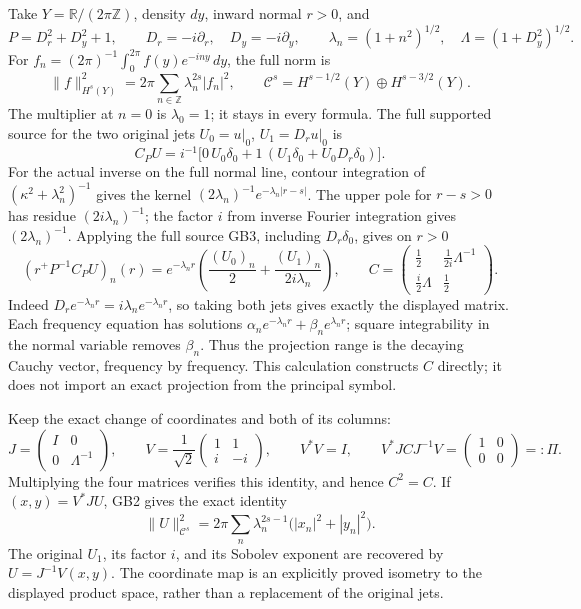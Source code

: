 \documentclass[
  11pt,
]{article}
\begin{document}
Take \(Y=\mathbb R/(2\pi\mathbb Z)\), density \(dy\), inward normal
\(r>0\), and \[
 P=D_r^2+D_y^2+1,\qquad D_r=-i\partial_r,\quad D_y=-i\partial_y,
 \qquad \lambda_n=(1+n^2)^{1/2},\quad \Lambda=(1+D_y^2)^{1/2}.
 \tag{GB1}
\] For \(f_n=(2\pi)^{-1}\int_0^{2\pi}f(y)e^{-iny}\,dy\), the full norm
is \[
 \|f\|_{H^s(Y)}^2=2\pi\sum_{n\in\mathbb Z}\lambda_n^{2s}|f_n|^2,
 \qquad \mathcal C^s=H^{s-1/2}(Y)\oplus H^{s-3/2}(Y).
 \tag{GB2}
\] The multiplier at \(n=0\) is \(\lambda_0=1\); it stays in every
formula. The full supported source for the two original jets
\(U_0=u|_0\), \(U_1=D_ru|_0\) is \[
 C_PU=i^{-1}\bigl[0\,U_0\delta_0+1\,(U_1\delta_0+U_0D_r\delta_0)\bigr].
 \tag{GB3}
\] For the actual inverse on the full normal line, contour integration
of \((\kappa^2+\lambda_n^2)^{-1}\) gives the kernel
\((2\lambda_n)^{-1}e^{-\lambda_n|r-s|}\). The upper pole for \(r-s>0\)
has residue \((2i\lambda_n)^{-1}\); the factor \(i\) from inverse
Fourier integration gives \((2\lambda_n)^{-1}\). Applying the full
source GB3, including \(D_r\delta_0\), gives on \(r>0\) \[
 (r^+P^{-1}C_PU)_n(r)
 =e^{-\lambda_n r}\left(\frac{(U_0)_n}{2}
                           +\frac{(U_1)_n}{2i\lambda_n}\right),
 \qquad
 C=\begin{pmatrix}\frac12&\frac1{2i}\Lambda^{-1}\\
                  \frac i2\Lambda&\frac12\end{pmatrix}.
 \tag{GB4}
\] Indeed \(D_re^{-\lambda_n r}=i\lambda_ne^{-\lambda_n r}\), so taking
both jets gives exactly the displayed matrix. Each frequency equation
has solutions \(\alpha_ne^{-\lambda_nr}+\beta_ne^{\lambda_nr}\); square
integrability in the normal variable removes \(\beta_n\). Thus the
projection range is the decaying Cauchy vector, frequency by frequency.
This calculation constructs \(C\) directly; it does not import an exact
projection from the principal symbol.

Keep the exact change of coordinates and both of its columns: \[
 J=\begin{pmatrix}I&0\\0&\Lambda^{-1}\end{pmatrix},\qquad
 V=\frac1{\sqrt2}\begin{pmatrix}1&1\\i&-i\end{pmatrix},\qquad
 V^*V=I,\qquad V^*JCJ^{-1}V=\begin{pmatrix}1&0\\0&0\end{pmatrix}=:\Pi.
 \tag{GB5}
\] Multiplying the four matrices verifies this identity, and hence
\(C^2=C\). If \((x,y)=V^*JU\), GB2 gives the exact identity \[
 \|U\|_{\mathcal C^s}^2
 =2\pi\sum_n\lambda_n^{2s-1}\bigl(|x_n|^2+|y_n|^2\bigr).
 \tag{GB6}
\] The original \(U_1\), its factor \(i\), and its Sobolev exponent are
recovered by \(U=J^{-1}V(x,y)\). The coordinate map is an explicitly
proved isometry to the displayed product space, rather than a
replacement of the original jets.
\end{document}
